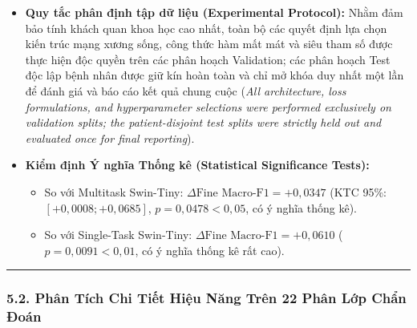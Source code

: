 \documentclass[
  11pt,
  a4paper,
]{article}
\providecommand{\tightlist}{%
  \setlength{\itemsep}{0pt}\setlength{\parskip}{0pt}}
\begin{document}
\begin{itemize}
\item
  \textbf{Quy tắc phân định tập dữ liệu (Experimental Protocol):} Nhằm
  đảm bảo tính khách quan khoa học cao nhất, toàn bộ các quyết định lựa
  chọn kiến trúc mạng xương sống, công thức hàm mất mát và siêu tham số
  được thực hiện độc quyền trên các phân hoạch Validation; các phân
  hoạch Test độc lập bệnh nhân được giữ kín hoàn toàn và chỉ mở khóa duy
  nhất một lần để đánh giá và báo cáo kết quả chung cuộc (\emph{All
  architecture, loss formulations, and hyperparameter selections were
  performed exclusively on validation splits; the patient-disjoint test
  splits were strictly held out and evaluated once for final
  reporting}).
\item
  \textbf{Kiểm định Ý nghĩa Thống kê (Statistical Significance Tests):}

  \begin{itemize}
  \tightlist
  \item
    So với Multitask Swin-Tiny:
    \(\Delta \text{Fine Macro-F1} = +0{,}0347\) (KTC 95\%:
    \([+0{,}0008; +0{,}0685]\), \(p = 0{,}0478 < 0{,}05\), có ý nghĩa
    thống kê).
  \item
    So với Single-Task Swin-Tiny:
    \(\Delta \text{Fine Macro-F1} = +0{,}0610\)
    (\(p = 0{,}0091 < 0{,}01\), có ý nghĩa thống kê rất cao).
  \end{itemize}
\end{itemize}

\begin{center}\rule{0.5\linewidth}{0.5pt}\end{center}

\subsubsection{5.2. Phân Tích Chi Tiết Hiệu Năng Trên 22 Phân Lớp Chẩn
Đoán}\label{phuxe2n-tuxedch-chi-tiux1ebft-hiux1ec7u-nux103ng-truxean-22-phuxe2n-lux1edbp-chux1ea9n-ux111ouxe1n}
\end{document}
